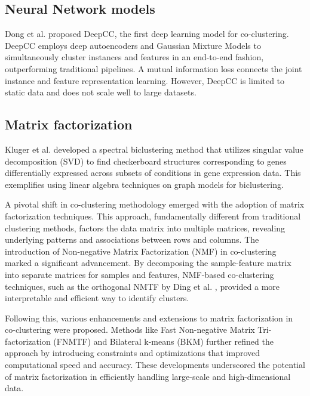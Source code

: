 \subsection{Neural Network models}
Dong et al.\cite{dongkuanxu2019DeepCoClustering} proposed DeepCC, the first deep learning model for co-clustering. DeepCC employs deep autoencoders and Gaussian Mixture Models to simultaneously cluster instances and features in an end-to-end fashion, outperforming traditional pipelines. A mutual information loss connects the joint instance and feature representation learning. However, DeepCC is limited to static data and does not scale well to large datasets.

\subsection{Matrix factorization}
Kluger et al. \cite{kluger2003SpectralBiclusteringMicroarray} developed a spectral biclustering method that utilizes singular value decomposition (SVD) to find checkerboard structures corresponding to genes differentially expressed across subsets of conditions in gene expression data. This exemplifies using linear algebra techniques on graph models for biclustering.

A pivotal shift in co-clustering methodology emerged with the adoption of matrix factorization techniques. This approach, fundamentally different from traditional clustering methods, factors the data matrix into multiple matrices, revealing underlying patterns and associations between rows and columns. The introduction of Non-negative Matrix Factorization (NMF) in co-clustering marked a significant advancement. By decomposing the sample-feature matrix into separate matrices for samples and features, NMF-based co-clustering techniques, such as the orthogonal NMTF by Ding et al. \cite{ding2006OrthogonalNonnegativeMatrix}, provided a more interpretable and efficient way to identify clusters.

Following this, various enhancements and extensions to matrix factorization in co-clustering were proposed. Methods like Fast Non-negative Matrix Tri-factorization (FNMTF) \cite{wang2019DualHypergraphRegularized}and Bilateral k-means (BKM) \cite{junweihan2017BilateralKMeansAlgorithm} further refined the approach by introducing constraints and optimizations that improved computational speed and accuracy. These developments underscored the potential of matrix factorization in efficiently handling large-scale and high-dimensional data.

